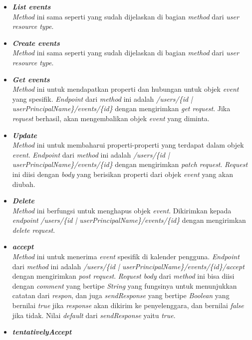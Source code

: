 \begin{itemize}
	\item \textbf{\textit{List events}}\\
	\textit{Method} ini sama seperti yang sudah dijelaskan di bagian \textit{method} dari \textit{user resource type}. 
	\item \textbf{\textit{Create events}}\\
	\textit{Method} ini sama seperti yang sudah dijelaskan di bagian \textit{method} dari \textit{user resource type}. 
	\item \textbf{\textit{Get events}}\\
	\textit{Method} ini untuk mendapatkan properti dan hubungan untuk objek \textit{event} yang spesifik. \textit{Endpoint} dari \textit{method} ini adalah \textit{/users/\{id | userPrincipalName\}/events/\{id\}} dengan mengirimkan \textit{get request}. Jika \textit{request} berhasil, akan mengembalikan objek \textit{event} yang diminta.
	\item \textbf{\textit{Update}}\\
	\textit{Method} ini untuk membaharui properti-properti yang terdapat dalam objek \textit{event}. \textit{Endpoint} dari \textit{method} ini adalah \textit{/users/\{id | userPrincipalName\}/events/\{id\}} dengan mengirimkan \textit{patch request}. \textit{Request} ini diisi dengan \textit{body} yang berisikan properti dari objek \textit{event} yang akan diubah. 
	\item \textbf{\textit{Delete}}\\
	\textit{Method} ini berfungsi untuk menghapus objek \textit{event}. Dikirimkan kepada \textit{endpoint} \textit{/users/\{id | userPrincipalName\}/events/\{id\}} dengan mengirimkan \textit{delete request}. 
	\item \textbf{\textit{accept}}\\
	\textit{Method} ini untuk menerima \textit{event} spesifik di kalender pengguna. \textit{Endpoint} dari \textit{method} ini adalah \textit{/users/\{id | userPrincipalName\}/events/\{id\}/accept} dengan mengirimkan \textit{post request}. \textit{Request body} dari \textit{method} ini bisa diisi dengan \textit{comment} yang bertipe \textit{String} yang fungsinya untuk menunjukkan catatan dari \textit{respon}, dan juga \textit{sendResponse} yang bertipe \textit{Boolean} yang bernilai \textit{true} jika \textit{response} akan dikirim ke penyelenggara, dan bernilai \textit{false} jika tidak. Nilai \textit{default} dari \textit{sendResponse} yaitu \textit{true}. 
	\item \textbf{\textit{tentativelyAccept}}\\

\end{itemize}
